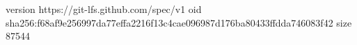 version https://git-lfs.github.com/spec/v1
oid sha256:f68af9e256997da77effa2216f13c4cae096987d176ba80433ffdda746083f42
size 87544

